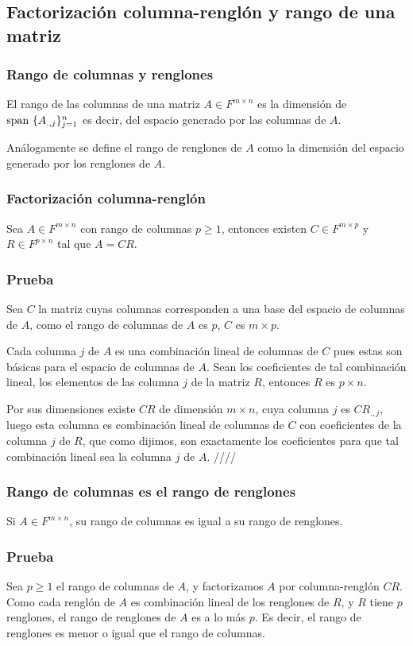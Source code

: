 \documentclass{article}
\begin{document}
\subsection{Factorización columna-renglón y rango de una matriz}
\subsubsection{Rango de columnas y renglones}
El rango de las columnas de una matriz $A\in F^{m\times n}$
es la dimensión de \\
$\text{span } \{A_{.,j}\}_{j=1}^n$ es decir, del
espacio generado por las columnas de $A$.

Análogamente se define el rango de renglones de $A$ como la 
dimensión del espacio generado por los renglones de $A$.

\subsubsection{Factorización columna-renglón}
Sea $A\in F^{m\times n}$ con rango de columnas $p\geq 1$,
entonces existen $C\in F^{m\times p}$ y $R\in F^{p\times n}$
tal que $A=CR$.
\subsubsection*{Prueba}
Sea $C$ la matriz cuyas columnas corresponden a una base del
espacio de columnas de $A$, como el rango de columnas de $A$ es $p$,
$C$ es $m\times p$.

Cada columna $j$ de $A$ es una combinación lineal
de columnas de $C$ pues estas son básicas para el espacio de columnas
de $A$. Sean los coeficientes de tal combinación lineal, los elementos
de las columna $j$ de la matriz $R$, entonces $R$ es $p\times n$.

Por sus dimensiones existe $CR$ de dimensión $m\times n$, cuya columna
$j$ es $CR_{.,j}$, luego esta columna es combinación lineal de columnas
de $C$ con coeficientes de la columna $j$ de $R$, que como dijimos, son
exactamente los coeficientes para que tal combinación lineal sea la columna $j$ de $A$. \hfill ////

\subsubsection{Rango de columnas es el rango de renglones}
Si $A\in F^{m\times n}$, su rango de columnas es igual a su rango
de renglones.
\subsubsection*{Prueba}
Sea $p\geq 1$ el rango de columnas de $A$, y factorizamos $A$
por columna-renglón $CR$. Como cada renglón de $A$ es
combinación lineal de los renglones de $R$, y $R$ tiene $p$
renglones, el rango de renglones de $A$ es a lo más $p$.
Es decir, el rango de renglones es menor o igual que el rango de 
columnas.
\end{document}
